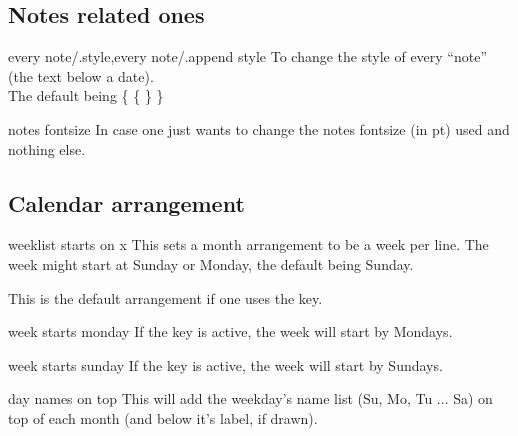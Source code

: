 \documentclass{article}
\begin{document}
\subsection{Notes related ones}
\begin{codedescribe}[key]{every note/.style,every note/.append style}
To change the style of every ``note'' (the text below a date).\\ The default being \{  \{  \} \}
\end{codedescribe}

%
\begin{codedescribe}[key]{notes fontsize}
In case one just wants to change the notes fontsize (in pt) used and nothing else.
\end{codedescribe}

\subsection{Calendar arrangement}
\begin{codedescribe}[key]{weeklist starts on x}
This sets a month arrangement to be a week per line. The week might start at Sunday or Monday, the default being Sunday.
\end{codedescribe}

\begin{tsremark} 
This is the default arrangement if one uses the   key.
\end{tsremark}

\begin{codedescribe}[key]{week starts monday}
If the key  is active, the week will start by Mondays.
\end{codedescribe}

\begin{codedescribe}[key]{week starts sunday }
If the key  is active, the week will start by Sundays.
\end{codedescribe}

\begin{codedescribe}[key]{day names on top}
This will add the weekday's name list (Su, Mo, Tu ... Sa) on top of each month (and below it's label, if drawn).
\end{codedescribe}
\end{document}
